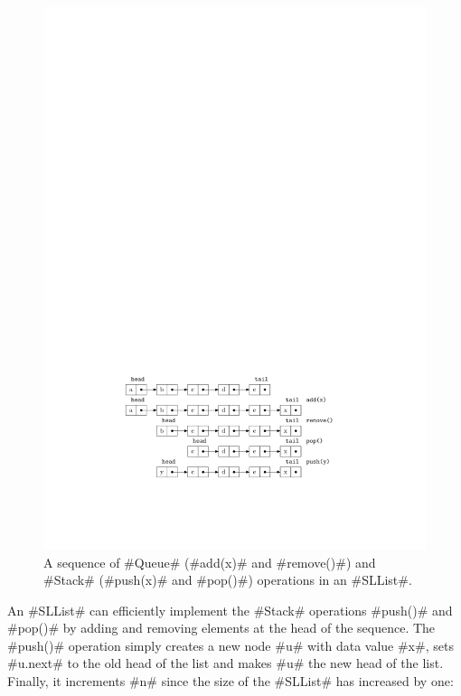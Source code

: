 \begin{figure}
  \begin{center}
    \includegraphics{figs/sllist}
  \end{center}
  \caption{A sequence of #Queue# (#add(x)# and #remove()#) and #Stack# (#push(x)# and #pop()#) operations in an #SLList#.}
\end{figure}


An #SLList# can efficiently implement the #Stack# operations #push()#
and #pop()# by adding and removing elements at the head of the sequence.
The #push()# operation simply creates a new node #u# with data value #x#,
sets #u.next# to the old head of the list and makes #u# the new head
of the list. Finally, it increments #n# since the size of the #SLList#
has increased by one:


